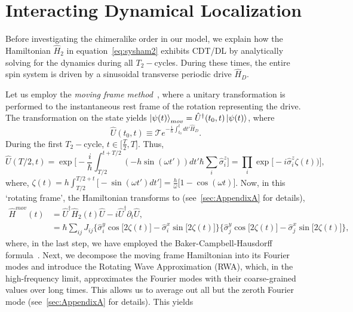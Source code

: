 \documentclass[12pt]{iopart}
\begin{document}
\section{\label{sec:level2} Interacting Dynamical Localization}

Before investigating the chimeralike order in our model, we explain how the Hamiltonian $\hat{H}_2$ in equation~\eqref{eq:sysham2} exhibits CDT/DL by analytically solving for the dynamics during all $T_2-$cycles. During these times,  the entire spin system is driven by a sinusoidal transverse periodic drive $\hat{H}_D$.
	
Let us employ the \textit{moving frame method}~\cite{haldar_dynamical_2021}, where a unitary transformation is performed to the instantaneous rest frame of the rotation representing the drive. The transformation on the state yields $\ket{\psi(t)}_{mov} = \hat{U}^\dagger(t_0,t) \ket{\psi(t)}$, where 
\begin{equation}
    \hat{U}(t_0,t) \equiv \mathcal{T} e^{-\frac{i}{\hbar}\int_{t_0}^{t} dt' \hat{H}_D}.
    \label{eq:rot1}
\end{equation}
During the first $T_2-$cycle, $t \in{\Big[\frac{T}{2}, T \Big]}$. Thus,
\begin{equation}
    \hat{U}\left(T/2,t\right) = \exp \Bigg[-\frac{i}{\hbar}\int_{T/2}^{t+T/2} (-h \sin(\omega t'))dt'\hbar\sum_i\hat{\sigma}^z_i\Bigg]
    = \prod_{i} \exp\Big[-i \hat{\sigma}^z_i\zeta(t))\Big],
\end{equation}
where, $\displaystyle{
    \zeta (t) = h\int_{T/2}^{T/2+t}  \Big[-\sin(\omega t')dt'\Big]=  \frac{h}{\omega}\Big[1-\cos(\omega t)\Big]}$.		
Now, in this `rotating frame', the Hamiltonian transforms to (see~\ref{sec:AppendixA} for details),
\begin{align}
    \hat{H}^{mov}(t) &= \hat{U}^\dagger \hat{H}_2(t) \hat{U}- i \hat{U}^\dagger \partial_t \hat{U},\nonumber\\
    &=\hbar\sum_{ij}J_{ij}\Big\{\hat{\sigma}^y_i\cos{\big[2\zeta(t)\big]}-\hat{\sigma}^x_i\sin{\big[2\zeta(t)\big]}\Big\}\Big\{\hat{\sigma}^y_j\cos{\big[2\zeta(t)\big]}-\hat{\sigma}^x_j\sin{\big[2\zeta(t)\big]}\Big\},
    \label{eq:movham}
\end{align}
where, in the last step, we have employed the Baker-Campbell-Hausdorff formula~\cite{Magnus1954}. Next, we decompose the moving frame Hamiltonian into its Fourier modes and introduce the Rotating Wave Approximation (RWA), which, in the high-frequency limit, approximates the Fourier modes with their coarse-grained values over long times. This allows us to average out all but the zeroth Fourier mode (see~\ref{sec:AppendixA} for details). This yields
\end{document}
